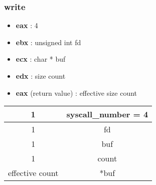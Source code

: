 \documentclass{report}
\begin{document}
\subsubsection*{write}
\begin{itemize}
  \item \textbf{eax} : 4
  \item \textbf{ebx} : unsigned int fd
  \item \textbf{ecx} : char * buf
  \item \textbf{edx} : size count
  \item \textbf{eax} (return value) : effective size count
\end{itemize}
\begin{tabular}{ | c | c | }
\hline
1 & syscall\_number = 4 \\ \hline 
1 & fd \\ \hline 
1 & buf \\ \hline 
1 & count \\ \hline
effective count & *buf \\ \hline
\end{tabular}
\\
\end{document}
